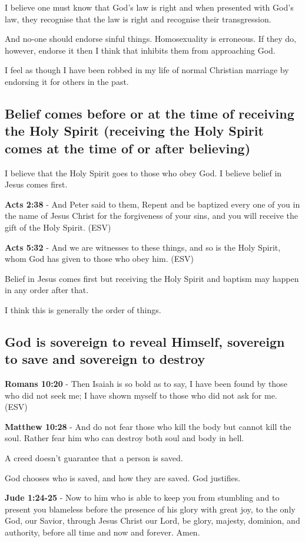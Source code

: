 \documentclass[11pt]{article}
\begin{document}
I believe one must know that God's law is right and when presented with God's law, they recognise that the law is right and recognise their transgression.

And no-one should endorse sinful things. Homosexuality is erroneous.
If they do, however, endorse it then I think that inhibits them from approaching God.

I feel as though I have been robbed in my life of normal Christian marriage by endorsing it for others in the past.

\subsection{Belief comes before or at the time of receiving the Holy Spirit (receiving the Holy Spirit comes at the time of or after believing)}
\label{sec:org404655b}
I believe that the Holy Spirit goes to those who obey God. I believe belief in Jesus comes first.

\textbf{Acts 2:38} - And Peter said to them, Repent and be baptized every one of you in the name of Jesus Christ for the forgiveness of your sins, and you will receive the gift of the Holy Spirit. (ESV)

\textbf{Acts 5:32} - And we are witnesses to these things, and so is the Holy Spirit, whom God has given to those who obey him. (ESV)

Belief in Jesus comes first but receiving the Holy Spirit and baptism may happen in any order after that.

I think this is generally the order of things.

\subsection{God is sovereign to reveal Himself, sovereign to save and sovereign to destroy}
\label{sec:orgae54587}

\textbf{Romans 10:20} - Then Isaiah is so bold as to say, I have been found by those who did not seek me; I have shown myself to those who did not ask for me. (ESV)

\textbf{Matthew 10:28} - And do not fear those who kill the body but cannot kill the soul. Rather fear him who can destroy both soul and body in hell.

A creed doesn't guarantee that a person is saved.

God chooses who is saved, and how they are saved.
God justifies.

\textbf{Jude 1:24-25} - Now to him who is able to keep you from stumbling and to present you blameless before the presence of his glory with great joy, to the only God, our Savior, through Jesus Christ our Lord, be glory, majesty, dominion, and authority, before all time and now and forever. Amen.
\end{document}
